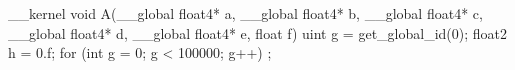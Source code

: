 __kernel void A(__global float4* a, __global float4* b, __global float4* c, __global float4* d, __global float4* e, float f) {
  uint g = get_global_id(0);
  float2 h = 0.f;
  for (int g = 0; g < 100000; g++) {
    ;
  }
}